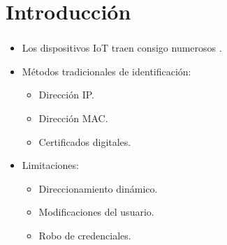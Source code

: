 \section{Introducción}

\begin{frame}
\frametitle{\secname} %
\framesubtitle{} %
\rmfamily %
\color{black} %
\begin{itemize}
    \item Los dispositivos IoT traen consigo numerosos .
    \item Métodos tradicionales de identificación:
        \begin{itemize}
            \item Dirección IP.
            \item Dirección MAC.
            \item Certificados digitales.
        \end{itemize}
    \item Limitaciones:
        \begin{itemize}
            \item Direccionamiento dinámico.
            \item Modificaciones del usuario.
            \item Robo de credenciales.
        \end{itemize}
\end{itemize}
\end{frame}


